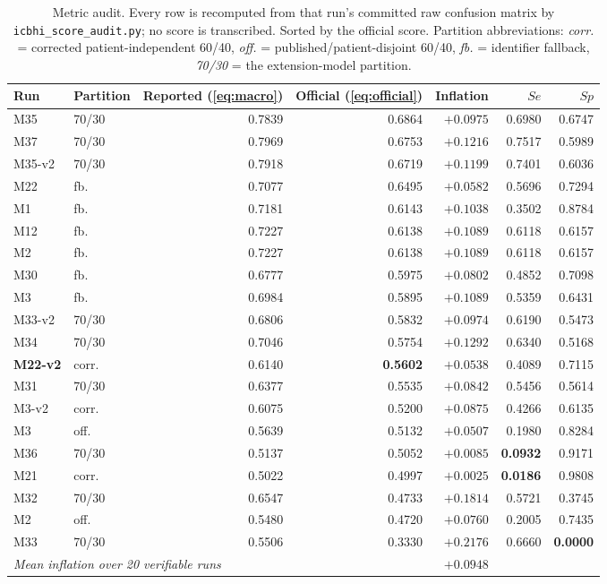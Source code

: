 \documentclass[journal,onecolumn]{IEEEtran}
\newcommand{\best}[1]{\textbf{#1}}
\begin{document}
\begin{table}[!t]
\centering
\caption{Metric audit. Every row is recomputed from that run's committed raw
confusion matrix by \texttt{icbhi\_score\_audit.py}; no score is transcribed.
Sorted by the official score. Partition abbreviations: \emph{corr.} = corrected
patient-independent 60/40, \emph{off.} = published/patient-disjoint 60/40,
\emph{fb.} = identifier fallback, \emph{70/30} = the extension-model partition.}
\label{tab:metricaudit}
\small
\begin{tabular}{llrrrrr}
\toprule
Run & Partition & Reported (\ref{eq:macro}) & \best{Official (\ref{eq:official})} & Inflation & $Se$ & $Sp$ \\
\midrule
M35            & 70/30 & 0.7839 & 0.6864 & $+0.0975$ & 0.6980 & 0.6747 \\
M37            & 70/30 & 0.7969 & 0.6753 & $+0.1216$ & 0.7517 & 0.5989 \\
M35-v2         & 70/30 & 0.7918 & 0.6719 & $+0.1199$ & 0.7401 & 0.6036 \\
M22            & fb.   & 0.7077 & 0.6495 & $+0.0582$ & 0.5696 & 0.7294 \\
M1             & fb.   & 0.7181 & 0.6143 & $+0.1038$ & 0.3502 & 0.8784 \\
M12            & fb.   & 0.7227 & 0.6138 & $+0.1089$ & 0.6118 & 0.6157 \\
M2             & fb.   & 0.7227 & 0.6138 & $+0.1089$ & 0.6118 & 0.6157 \\
M30            & fb.   & 0.6777 & 0.5975 & $+0.0802$ & 0.4852 & 0.7098 \\
M3             & fb.   & 0.6984 & 0.5895 & $+0.1089$ & 0.5359 & 0.6431 \\
M33-v2         & 70/30 & 0.6806 & 0.5832 & $+0.0974$ & 0.6190 & 0.5473 \\
M34            & 70/30 & 0.7046 & 0.5754 & $+0.1292$ & 0.6340 & 0.5168 \\
\best{M22-v2}  & corr. & 0.6140 & \best{0.5602} & $+0.0538$ & 0.4089 & 0.7115 \\
M31            & 70/30 & 0.6377 & 0.5535 & $+0.0842$ & 0.5456 & 0.5614 \\
M3-v2          & corr. & 0.6075 & 0.5200 & $+0.0875$ & 0.4266 & 0.6135 \\
M3             & off.  & 0.5639 & 0.5132 & $+0.0507$ & 0.1980 & 0.8284 \\
M36            & 70/30 & 0.5137 & 0.5052 & $+0.0085$ & \best{0.0932} & 0.9171 \\
M21            & corr. & 0.5022 & 0.4997 & $+0.0025$ & \best{0.0186} & 0.9808 \\
M32            & 70/30 & 0.6547 & 0.4733 & $+0.1814$ & 0.5721 & 0.3745 \\
M2             & off.  & 0.5480 & 0.4720 & $+0.0760$ & 0.2005 & 0.7435 \\
M33            & 70/30 & 0.5506 & 0.3330 & $+0.2176$ & 0.6660 & \best{0.0000} \\
\midrule
\multicolumn{4}{l}{\emph{Mean inflation over 20 verifiable runs}} & $\mathbf{+0.0948}$ & & \\
\bottomrule
\end{tabular}


\end{table}
\end{document}
